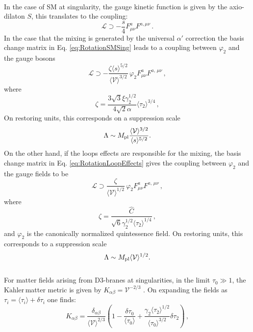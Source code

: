 \documentclass[11pt,a4paper]{article}
\newcommand{\be}{\begin{equation}}
\newcommand{\ee}{\end{equation}}
\newcommand{\V}{\mathcal{V}}
\newcommand{\Kahler}{\ensuremath{\text{K}\ddot{\text{a}}\text{hler}\,}}
\begin{document}
\\
In the case of SM at singularity, the gauge kinetic function is given by the axio-dilaton $S$, this translates to the coupling:
%
\begin{equation}
\label{eq:GaugeCouplingDil}
\mathcal{L} \supset  -\frac{s}{4} F^a_{\mu \nu} F^{a, \mu \nu} \,.
\end{equation}
%
In the case that the mixing is generated by the universal $\alpha'$ correction the basis change matrix in Eq. \eqref{eq:RotationSMSing} leads to a coupling between $\varphi_2$ and the gauge bosons 
%
\begin{equation}
\mathcal{L} \supset - \frac{\zeta \langle s\rangle^{5/2}}{\langle\V\rangle^{3/2}}\, \varphi_2 F^a_{\mu \nu} F^{a,\,\mu \nu} \,,
\end{equation}
%
where
%
\begin{equation}
\zeta = \frac{3 \sqrt{3} \xi \gamma_2^{1/2}}{4 \sqrt{2} \alpha} \langle\tau_2\rangle^{3/4} \,,
\end{equation}
%
On restoring units, this corresponds on a suppression scale 
%
\be
\label{supr}
  \Lambda \sim M_{\rm pl} \frac{\langle\V\rangle^{3/2}}{\langle s \rangle^{5/2}}.
\ee
%
On the other hand, if the loops effects are responsible for the mixing, the basis change matrix in Eq. \eqref{eq:RotationLoopEffects} gives the coupling between $\varphi_2$ and the gauge fields to be
%
\begin{equation}
\mathcal{L} \supset \frac{\zeta}{\langle\V\rangle^{1/2}} \, \varphi_2 F^a_{\mu \nu} F^{a,\,\mu \nu} \,,
\end{equation}
%
where
%
\begin{equation}
\zeta = \frac{\hat{C}}{\sqrt{6} \gamma_2^{1/2} \langle \tau_2 \rangle^{1/4}} \,,
\end{equation}
%
and $\varphi_2$ is the canonically normalized quintessence field. On restoring units, this corresponds to a suppression scale
%
\be
\label{supr}
  \Lambda \sim M_{\rm pl} \langle\V\rangle^{1/2}.
\ee
%
\\
For matter fields arising from D3-branes at singularities, in the limit $\tau_0 \gg 1$, the \Kahler matter metric is given by $K_{\alpha \beta} = \V^{-2/3}$ \cite{Conlon:2006tj, Aparicio:2008wh, Aparicio:2015psl}. On expanding the fields as $\tau_i = \langle \tau_i \rangle + \delta \tau_i$ one finds:
%
\begin{equation}
K_{\alpha \beta} = \frac{\delta_{\alpha \beta}}{\langle \V \rangle^{2/3}} \left(1  - \frac{\delta \tau_0}{\langle \tau_0 \rangle} + \frac{\gamma_2 \langle \tau_2 \rangle^{1/2}}{\langle \tau_0 \rangle^{3/2}} \delta \tau_2\right) \,,
\end{equation}
\end{document}
